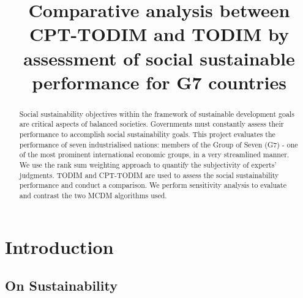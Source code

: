 \documentclass{infor}
\theoremstyle{remark}
\begin{document}
\begin{frontmatter}

\title{Comparative analysis between CPT-TODIM and TODIM by assessment of social sustainable performance for G7 countries}


\author[a]{ }
\author[a]{ }
\address[a]{Department of Mathematics, , }

\begin{abstract}
Social sustainability objectives within the framework of sustainable development goals are critical aspects of balanced societies. Governments must constantly assess their performance to accomplish social sustainability goals. This project evaluates the performance of seven industrialised nations: members of the Group of Seven (G7) - one of the most prominent international economic groups, in a very streamlined manner. We use the rank sum weighting approach to quantify the subjectivity of experts’ judgments. TODIM and CPT-TODIM are used to assess the social sustainability performance and conduct a comparison. We perform sensitivity analysis to evaluate and contrast the two MCDM algorithms used.
\end{abstract}

\begin{keywords}
\end{keywords}

\end{frontmatter}

\section{Introduction}

\subsection{On Sustainability}
\end{document}
